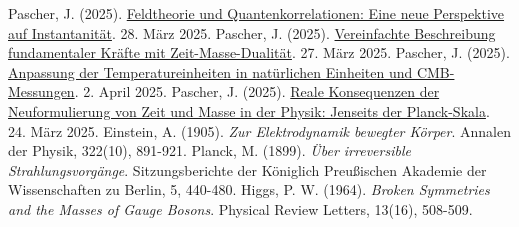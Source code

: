 \documentclass[a4paper,12pt]{article}
\begin{document}
\begin{thebibliography}{99}
		 Pascher, J. (2025). \href{https://github.com/jpascher/T0-Time-Mass-Duality/tree/main/2/pdf/Deutsch/FeldtheorieQuanten.pdf}{Feldtheorie und Quantenkorrelationen: Eine neue Perspektive auf Instantanität}. 28. März 2025.
		 Pascher, J. (2025). \href{https://github.com/jpascher/T0-Time-Mass-Duality/tree/main/2/pdf/Deutsch/VierKraefteZeitMasse.pdf}{Vereinfachte Beschreibung fundamentaler Kräfte mit Zeit-Masse-Dualität}. 27. März 2025.
		 Pascher, J. (2025). \href{https://github.com/jpascher/T0-Time-Mass-Duality/tree/main/2/pdf/Deutsch/TempEinheitenCMB.pdf}{Anpassung der Temperatureinheiten in natürlichen Einheiten und CMB-Messungen}. 2. April 2025.
		 Pascher, J. (2025). \href{https://github.com/jpascher/T0-Time-Mass-Duality/tree/main/2/pdf/Deutsch/JenseitsPlanck.pdf}{Reale Konsequenzen der Neuformulierung von Zeit und Masse in der Physik: Jenseits der Planck-Skala}. 24. März 2025.
		 Einstein, A. (1905). \textit{Zur Elektrodynamik bewegter Körper}. Annalen der Physik, 322(10), 891-921.
		 Planck, M. (1899). \textit{Über irreversible Strahlungsvorgänge}. Sitzungsberichte der Königlich Preußischen Akademie der Wissenschaften zu Berlin, 5, 440-480.
		 Higgs, P. W. (1964). \textit{Broken Symmetries and the Masses of Gauge Bosons}. Physical Review Letters, 13(16), 508-509.
	\end{thebibliography}
	
\end{document}
